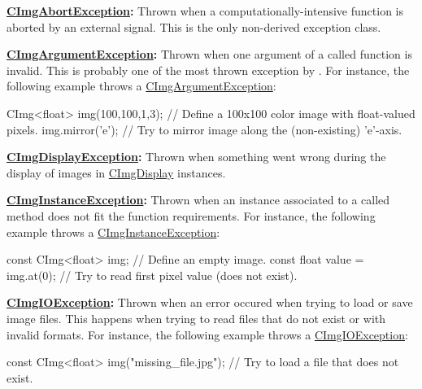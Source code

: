 \begin{DoxyItemize}
\item {\bfseries \hyperlink{structcimg__library__suffixed_1_1CImgAbortException}{C\+Img\+Abort\+Exception}\+:} Thrown when a computationally-\/intensive function is aborted by an external signal. This is the only {\ttfamily non-\/derived} exception class.
\item {\bfseries \hyperlink{structcimg__library__suffixed_1_1CImgArgumentException}{C\+Img\+Argument\+Exception}\+:} Thrown when one argument of a called  function is invalid. This is probably one of the most thrown exception by . For instance, the following example throws a {\ttfamily \hyperlink{structcimg__library__suffixed_1_1CImgArgumentException}{C\+Img\+Argument\+Exception}\+:} 
\begin{DoxyCode}
CImg<float> img(100,100,1,3); \textcolor{comment}{// Define a 100x100 color image with float-valued pixels.}
img.mirror(\textcolor{charliteral}{'e'});              \textcolor{comment}{// Try to mirror image along the (non-existing) 'e'-axis.}
\end{DoxyCode}

\item {\bfseries \hyperlink{structcimg__library__suffixed_1_1CImgDisplayException}{C\+Img\+Display\+Exception}\+:} Thrown when something went wrong during the display of images in \hyperlink{structcimg__library__suffixed_1_1CImgDisplay}{C\+Img\+Display} instances.
\item {\bfseries \hyperlink{structcimg__library__suffixed_1_1CImgInstanceException}{C\+Img\+Instance\+Exception}\+:} Thrown when an instance associated to a called  method does not fit the function requirements. For instance, the following example throws a {\ttfamily \hyperlink{structcimg__library__suffixed_1_1CImgInstanceException}{C\+Img\+Instance\+Exception}\+:} 
\begin{DoxyCode}
\textcolor{keyword}{const} CImg<float> img;           \textcolor{comment}{// Define an empty image.}
\textcolor{keyword}{const} \textcolor{keywordtype}{float} value = img.at(0);   \textcolor{comment}{// Try to read first pixel value (does not exist).}
\end{DoxyCode}

\item {\bfseries \hyperlink{structcimg__library__suffixed_1_1CImgIOException}{C\+Img\+I\+O\+Exception}\+:} Thrown when an error occured when trying to load or save image files. This happens when trying to read files that do not exist or with invalid formats. For instance, the following example throws a {\ttfamily \hyperlink{structcimg__library__suffixed_1_1CImgIOException}{C\+Img\+I\+O\+Exception}\+:} 
\begin{DoxyCode}
\textcolor{keyword}{const} CImg<float> img(\textcolor{stringliteral}{"missing\_file.jpg"});  \textcolor{comment}{// Try to load a file that does not exist.}
\end{DoxyCode}


\end{DoxyItemize}
